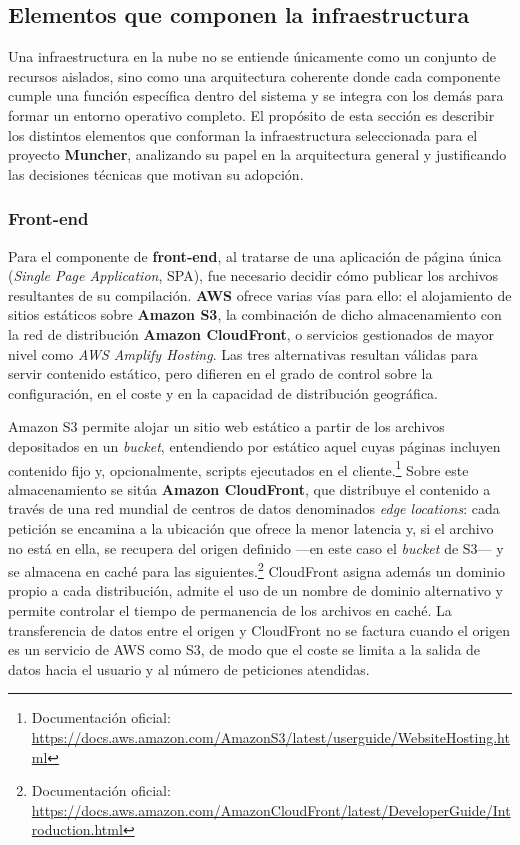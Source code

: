 \subsection*{Elementos que componen la infraestructura}

Una infraestructura en la nube no se entiende únicamente como un conjunto de recursos aislados, sino como una arquitectura coherente donde cada componente cumple una función específica dentro del sistema y se integra con los demás para formar un entorno operativo completo. El propósito de esta sección es describir los distintos elementos que conforman la infraestructura seleccionada para el proyecto \textbf{Muncher}, analizando su papel en la arquitectura general y justificando las decisiones técnicas que motivan su adopción.

\subsubsection*{Front-end}

Para el componente de \textbf{front‑end}, al tratarse de una aplicación de página única (\textit{Single Page Application}, SPA), fue necesario decidir cómo publicar los archivos resultantes de su compilación. \textbf{AWS} ofrece varias vías para ello: el alojamiento de sitios estáticos sobre \textbf{Amazon S3}, la combinación de dicho almacenamiento con la red de distribución \textbf{Amazon CloudFront}, o servicios gestionados de mayor nivel como \textit{AWS Amplify Hosting}. Las tres alternativas resultan válidas para servir contenido estático, pero difieren en el grado de control sobre la configuración, en el coste y en la capacidad de distribución geográfica.

Amazon S3 permite alojar un sitio web estático a partir de los archivos depositados en un \textit{bucket}, entendiendo por estático aquel cuyas páginas incluyen contenido fijo y, opcionalmente, scripts ejecutados en el cliente.\footnote{Documentación oficial: \url{https://docs.aws.amazon.com/AmazonS3/latest/userguide/WebsiteHosting.html}} Sobre este almacenamiento se sitúa \textbf{Amazon CloudFront}, que distribuye el contenido a través de una red mundial de centros de datos denominados \textit{edge locations}: cada petición se encamina a la ubicación que ofrece la menor latencia y, si el archivo no está en ella, se recupera del origen definido —en este caso el \textit{bucket} de S3— y se almacena en caché para las siguientes.\footnote{Documentación oficial: \url{https://docs.aws.amazon.com/AmazonCloudFront/latest/DeveloperGuide/Introduction.html}} CloudFront asigna además un dominio propio a cada distribución, admite el uso de un nombre de dominio alternativo y permite controlar el tiempo de permanencia de los archivos en caché. La transferencia de datos entre el origen y CloudFront no se factura cuando el origen es un servicio de AWS como S3, de modo que el coste se limita a la salida de datos hacia el usuario y al número de peticiones atendidas.

